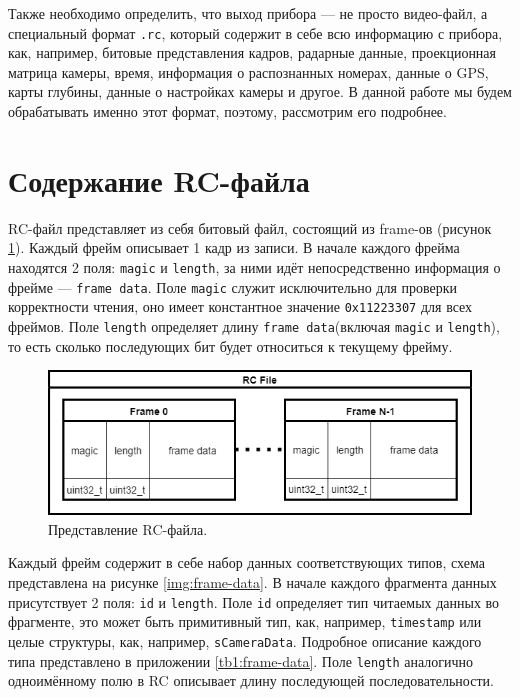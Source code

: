 \documentclass[specification,annotation,times]{itmo-student-thesis}
\begin{document}
Также необходимо определить, что выход прибора --- не просто видео-файл, а специальный формат \texttt{.rc}, который содержит в себе всю информацию с прибора, как, например, битовые представления кадров, радарные данные, проекционная матрица камеры, время, информация о распознанных номерах, данные о GPS, карты глубины, данные о настройках камеры и другое. В данной работе мы будем обрабатывать именно этот формат, поэтому, рассмотрим его подробнее.

\section{Содержание RC-файла} \label{par:rc-description}

RC-файл представляет из себя битовый файл, состоящий из frame-ов (рисунок \ref{img:rc-file}). Каждый фрейм описывает 1 кадр из записи. В начале каждого фрейма находятся 2 поля: \texttt{magic} и \texttt{length}, за ними идёт непосредственно информация о фрейме --- \texttt{frame data}. Поле \texttt{magic} служит исключительно для проверки корректности чтения, оно имеет константное значение \texttt{0x11223307} для всех фреймов. Поле \texttt{length} определяет длину \texttt{frame data}(включая \texttt{magic} и \texttt{length}), то есть сколько последующих бит будет относиться к текущему фрейму.

\begin{figure}[!ht]
	\caption{Представление RC-файла.}\label{img:rc-file}
	\includegraphics[width=0.85\linewidth]{../png/rc_file.png}
	\centering
\end{figure}

Каждый фрейм содержит в себе набор данных соответствующих типов, схема представлена на рисунке \ref{img:frame-data}. В начале каждого фрагмента данных присутствует 2 поля: \texttt{id} и \texttt{length}. Поле \texttt{id} определяет тип читаемых данных во фрагменте, это может быть примитивный тип, как, например, \texttt{timestamp} или целые структуры, как, например, \texttt{sCameraData}. Подробное описание каждого типа представлено в приложении \ref{tb1:frame-data}. Поле \texttt{length} аналогично одноимённому полю в RC описывает длину последующей последовательности.
\end{document}
